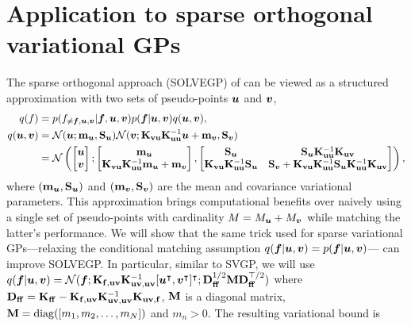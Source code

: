 \section{Application to sparse orthogonal variational GPs}
The sparse orthogonal approach (SOLVEGP) of \citet{shi2020sparse} can be viewed as a structured approximation with two sets of pseudo-points $\vu$ and $\vv$,
\begin{align}
    q(f) &= p(f_{\neq \vf, \vu, \vv} | \vf, \vu, \vv) p(\vf | \vu, \vv) q(\vu, \vv), \nonumber \\
    q(\vu, \vv) &= \gN(\vu; \rvm_\vu, \rmS_\vu) \gN(\vv; \kvu \kuuinv \vu + \rvm_\vv, \rmS_\vv) \nonumber \\ &= \gN\left( \begin{bmatrix} \vu \\ \vv \end{bmatrix} ; \begin{bmatrix} \rvm_\vu \\ \kvu\kuuinv \rvm_\vu + \rvm_\vv \end{bmatrix} , \begin{bmatrix} \rmS_\vu & \rmS_\vu \kuuinv \kuv \\ \kvu \kuuinv \rmS_\vu & \rmS_\vv + \kvu\kuuinv \rmS_\vu \kuuinv\kuv \end{bmatrix} \right),\nonumber
\end{align}
where $(\rvm_\vu, \rmS_\vu)$ and $(\rvm_\vv, \rmS_\vv)$ are the mean and covariance variational parameters. This approximation brings computational benefits over naively using a single set of pseudo-points with cardinality $M = M_\vu + M_\vv$ while matching the latter's performance. We will show that the same trick used for sparse variational GPs---relaxing the conditional matching assumption $q(\vf | \vu, \vv) = p(\vf | \vu, \vv)$--- can improve SOLVEGP. In particular, similar to SVGP, we will use $q(\vf | \vu, \vv) = \gN(\vf; \kfuv\kuvinv\vuv; \dff^{1/2} \rmM \dff^{\top/2})$ where $\dff = \kff - \kfuv\kuvinv\kuvf$, $\rmM$ is a diagonal matrix, $\rmM = \diag([m_1, m_2, \dots, m_N])$ and $m_n > 0$. The resulting variational bound is 

